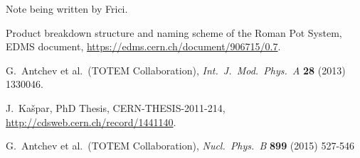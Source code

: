 \documentclass[TOTEM]{cern/cernphprep}
\def\etal{et al.}
\def\Name#1{#1, }
\def\Review#1#2#3#4{{\it #1} {\bf #2} (#3) #4}
\begin{document}

\begin{thebibliography}{99}

	Note being written by Frici.

	Product breakdown structure and naming scheme of the Roman Pot System, EDMS document,
	\url{https://edms.cern.ch/document/906715/0.7}.

	\Name{G.~Antchev \etal{}~(TOTEM Collaboration)}
	\Review{Int.~J.~Mod.~Phys.~A}{28}{2013}{1330046}.

	\Name{J.~Ka\v spar}
	PhD Thesis, CERN-THESIS-2011-214,
	\url{http://cdsweb.cern.ch/record/1441140}.


	\Name{G.~Antchev \etal{}~(TOTEM Collaboration)}
	\Review{Nucl.~Phys.~B}{899}{2015}{527-546}

\end{thebibliography}
\end{document}
